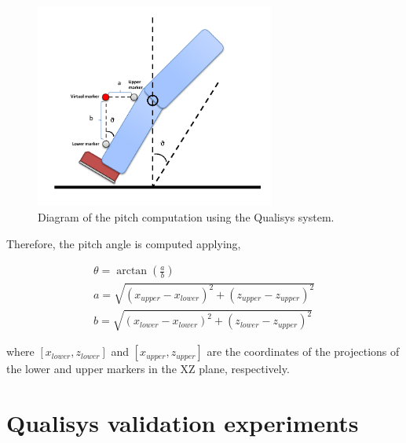 \begin{figure}[H]
\centering
\includegraphics[width=0.7\textwidth]{figures/qualisys_pitch}
\caption{Diagram of the pitch computation using the Qualisys system.}
\label{fig:pitch_triangle}
\end{figure}

\indent Therefore, the pitch angle is computed applying,

\begin{gather}
\theta = \arctan\left(\frac{a}{b}\right)\\
a=\sqrt{\left(x_{upper}-x_{lower}\right)^2+\left(z_{upper}-z_{upper}\right)^2}\\
b=\sqrt{\left(x_{lower}-x_{lower}\right)^2+\left(z_{lower}-z_{upper}\right)^2}
\label{eq:qs_pitch}
\end{gather}

where $[x_{lower},z_{lower}]$ and $[x_{upper},z_{upper}]$ are the coordinates of the projections of the lower and upper markers in the XZ plane, respectively.

\section{Qualisys validation experiments}
